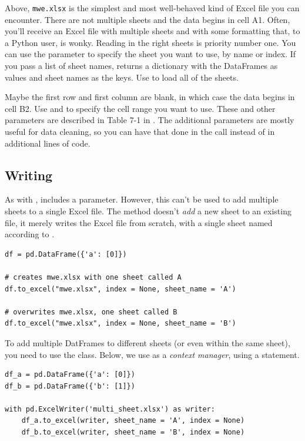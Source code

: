 Above, \texttt{mwe.xlsx} is the simplest and most well-behaved kind of Excel file you can encounter. There are not multiple sheets and the data begins in cell A1. Often, you'll receive an Excel file with multiple sheets and with some formatting that, to a Python user, is wonky. Reading in the right sheets is priority number one. You can use the  parameter to specify the sheet you want to use, by name or index. If you pass a list of sheet names,  returns a dictionary with the DataFrames as values and sheet names as the keys. Use  to load all of the sheets. 

Maybe the first row and first column are blank, in which case the data begins in cell B2. 
Use  and  to specify the cell range you want to use. These and other parameters are described in Table 7-1 in \cite{zumstein2021}. The additional parameters are mostly useful for data cleaning, so you can have that done in the  call instead of in additional lines of code. 

\subsection{Writing}

As with ,  includes a  parameter. However, this can't be used to add multiple sheets to a single Excel file. The method doesn't \emph{add} a new sheet to an existing file, it merely writes the Excel file from scratch, with a single sheet named according to . 

\begin{lstlisting}
df = pd.DataFrame({'a': [0]})

# creates mwe.xlsx with one sheet called A
df.to_excel("mwe.xlsx", index = None, sheet_name = 'A')

# overwrites mwe.xlsx, one sheet called B
df.to_excel("mwe.xlsx", index = None, sheet_name = 'B')
\end{lstlisting}


To add multiple DatFrames to different sheets (or even within the same sheet), you need to use the  class. Below, we use  as a \emph{context manager}, using a  statement. 

\begin{lstlisting}
df_a = pd.DataFrame({'a': [0]})
df_b = pd.DataFrame({'b': [1]})

with pd.ExcelWriter('multi_sheet.xlsx') as writer:
    df_a.to_excel(writer, sheet_name = 'A', index = None)
    df_b.to_excel(writer, sheet_name = 'B', index = None)
\end{lstlisting}

